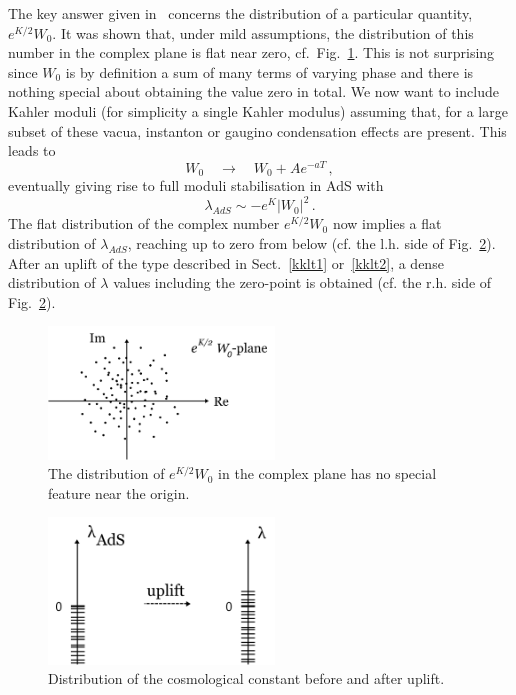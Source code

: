 \documentclass[12pt]{article}
\newcommand{\be}{\begin{equation}}
\newcommand{\ee}{\end{equation}}
\numberwithin{equation}{section}
\begin{document}
The key answer given in~\cite{Denef:2004ze} concerns the distribution of a particular quantity, $e^{K/2}W_0$. It was shown that, under mild assumptions, the distribution of this number in the complex plane is flat near zero, cf.~Fig.~\ref{w0d}. This is not surprising since $W_0$ is by definition a sum of many terms of varying phase and there is nothing special about obtaining the value zero in total. We now want to include Kahler moduli (for simplicity a single Kahler modulus) assuming that, for a large subset of these vacua, instanton or gaugino condensation effects are present. This leads to
\be
W_0\quad \to\quad W_0+A e^{-aT}\,,
\ee
eventually giving rise to full moduli stabilisation in AdS with 
\be
\lambda_{AdS}\sim -e^K|W_0|^2\,.
\ee
The flat distribution of the complex number $e^{K/2}W_0$ now implies a flat distribution of $\lambda_{AdS}$, reaching up to zero from below (cf. the l.h. side of Fig.~\ref{ll}). After an uplift of the type described in Sect.~\ref{kklt1} or~\ref{kklt2}, a dense distribution of $\lambda$ values including the zero-point is obtained (cf. the r.h. side of Fig.~\ref{ll}).

\begin{figure}[ht]
\begin{center} 
\includegraphics[width=6cm]{w0d.png}
\caption{The distribution of $e^{K/2}W_0$ in the complex plane has no special feature near the origin.}
\label{w0d} 
\end{center}
\end{figure}

\begin{figure}[ht]
\begin{center} 
\includegraphics[width=6cm]{ll.png}
\caption{Distribution of the cosmological constant before and after uplift.}
\label{ll} 
\end{center}
\end{figure}
\end{document}
